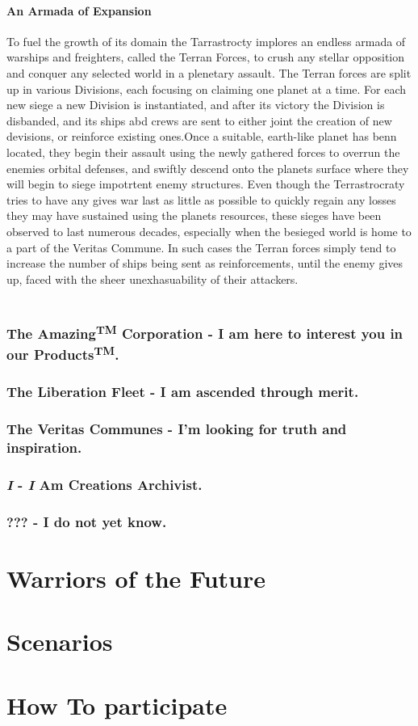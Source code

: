 \documentclass[a4paper,12pt]{book}
\begin{document}
\subsubsection*{An Armada of Expansion}
To fuel the growth of its domain the Tarrastrocty implores an endless armada of warships and freighters, called the Terran Forces, to crush any stellar opposition and conquer any selected world in a plenetary assault. The Terran forces are split up in various Divisions, each focusing on claiming one planet at a time. For each new siege a new Division is instantiated, and after its victory the Division is disbanded, and its ships abd crews are sent to either joint the creation of new devisions, or reinforce existing ones.Once a suitable, earth-like planet has benn located, they begin their assault using the newly gathered forces to overrun the enemies orbital defenses, and swiftly descend onto the planets surface where they will begin to siege impotrtent enemy structures. Even though the Terrastrocraty tries to have any gives war last as little as possible to quickly regain any losses they may have sustained using the planets resources, these sieges have been observed to last numerous decades, especially when the besieged world is home to a part of the Veritas Commune. In such cases the Terran forces simply tend to increase the number of ships being sent as reinforcements, until the enemy gives up, faced with the sheer unexhasuability of their attackers.\\
\\


\subsection{The Amazing\textsuperscript{TM} Corporation - I am here to interest you in our Products\textsuperscript{TM}.}

\subsection{The Liberation Fleet - I am ascended through merit.}

\subsection{The  Veritas Communes - I'm looking for truth and inspiration. }

\subsection{\textit{I} - \textit{I} Am Creations Archivist.}

\subsection{??? - I do not yet know.}

\chapter{Warriors of the Future}

\chapter{Scenarios}

\chapter{How To participate}
\end{document}
